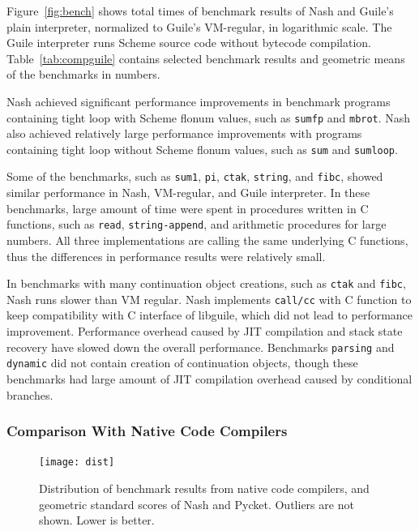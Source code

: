\documentclass[preprint, 10pt]{sigplanconf}
\begin{document}
Figure~\ref{fig:bench} shows total times of benchmark results of Nash and
Guile's plain interpreter, normalized to Guile's VM-regular, in logarithmic
scale.  The Guile interpreter runs Scheme source code without bytecode
compilation.  Table~\hyperref[tab:compguile]{\ref{tab:compguile}} contains
selected benchmark results and geometric means of the benchmarks in numbers.

Nash achieved significant performance improvements in benchmark programs
containing tight loop with Scheme flonum values, such as \texttt{sumfp} and
\texttt{mbrot}.  Nash also achieved relatively large performance improvements
with programs containing tight loop without Scheme flonum values, such as
\texttt{sum} and \texttt{sumloop}.

Some of the benchmarks, such as \texttt{sum1}, \texttt{pi}, \texttt{ctak},
\texttt{string}, and \texttt{fibc}, showed similar performance in Nash,
VM-regular, and Guile interpreter. In these benchmarks, large amount of time
were spent in procedures written in C functions, such as \texttt{read},
\texttt{string-append}, and arithmetic procedures for large numbers.  All
three implementations are calling the same underlying C functions, thus the
differences in performance results were relatively small.

In benchmarks with many continuation object creations, such as \texttt{ctak}
and \texttt{fibc}, Nash runs slower than VM regular. Nash implements
\texttt{call/cc} with C function to keep compatibility with C interface of
libguile, which did not lead to performance improvement.  Performance overhead
caused by JIT compilation and stack state recovery have slowed down the
overall performance.  Benchmarks \texttt{parsing} and \texttt{dynamic} did not
contain creation of continuation objects, though these benchmarks had large
amount of JIT compilation overhead caused by conditional branches.

\subsubsection{Comparison With Native Code Compilers}

\begin{figure}
  \centering
  \texttt{[image: dist]}
  \caption{Distribution of benchmark results from native code compilers, and
    geometric standard scores of Nash and Pycket.  Outliers are not shown. Lower
    is better.}
  \label{fig:dist}
\end{figure}
\end{document}
